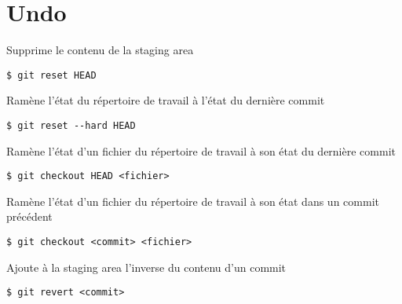 \section*{Undo}	
Supprime le contenu de la staging area 
\begin{lstlisting}
$ git reset HEAD 
\end{lstlisting}
Ramène l'état du répertoire de travail à l'état du dernière commit 
\begin{lstlisting}
$ git reset --hard HEAD 
\end{lstlisting}
Ramène l'état d'un fichier du répertoire de travail à son état du dernière commit 
\begin{lstlisting}
$ git checkout HEAD <fichier>
\end{lstlisting}
Ramène l'état d'un fichier du répertoire de travail à son état dans un commit précédent 
\begin{lstlisting}
$ git checkout <commit> <fichier>
\end{lstlisting}
Ajoute à la staging area l'inverse du contenu d'un commit 
\begin{lstlisting}
$ git revert <commit>
\end{lstlisting}